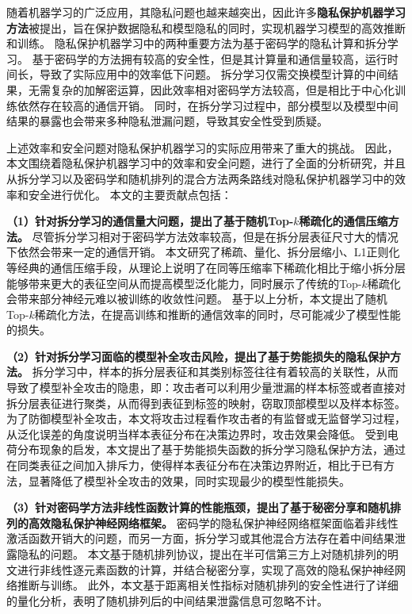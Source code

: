 \cleardoublepage
{}
随着机器学习的广泛应用，其隐私问题也越来越突出，因此许多\textbf{隐私保护机器学习方法}被提出，旨在保护数据隐私和模型隐私的同时，实现机器学习模型的高效推断和训练。
%
隐私保护机器学习中的两种重要方法为基于密码学的隐私计算和拆分学习。
基于密码学的方法拥有较高的安全性，但是其计算量和通信量较高，运行时间长，导致了实际应用中的效率低下问题。
拆分学习仅需交换模型计算的中间结果，无需复杂的加解密运算，因此效率相对密码学方法较高，但是相比于中心化训练依然存在较高的通信开销。
同时，在拆分学习过程中，部分模型以及模型中间结果的暴露也会带来多种隐私泄漏问题，导致其安全性受到质疑。
%

上述效率和安全问题对隐私保护机器学习的实际应用带来了重大的挑战。
%
因此，本文围绕着隐私保护机器学习中的效率和安全问题，进行了全面的分析研究，并且从拆分学习以及密码学和随机排列的混合方法两条路线对隐私保护机器学习中的效率和安全进行优化。
%
本文的主要贡献点包括：


\textbf{（1）针对拆分学习的通信量大问题，提出了基于随机Top-$k$稀疏化的通信压缩方法。}
尽管拆分学习相对于密码学方法效率较高，但是在拆分层表征尺寸大的情况下依然会带来一定的通信开销。
%
本文研究了稀疏、量化、拆分层缩小、L1正则化等经典的通信压缩手段，从理论上说明了在同等压缩率下稀疏化相比于缩小拆分层能够带来更大的表征空间从而提高模型泛化能力，同时展示了传统的Top-$k$稀疏化会带来部分神经元难以被训练的收敛性问题。
%
基于以上分析，本文提出了随机Top-$k$稀疏化方法，在提高训练和推断的通信效率的同时，尽可能减少了模型性能的损失。

\textbf{（2）针对拆分学习面临的模型补全攻击风险，提出了基于势能损失的隐私保护方法。}
拆分学习中，样本的拆分层表征和其类别标签往往有着较高的关联性，从而导致了模型补全攻击的隐患，即：攻击者可以利用少量泄漏的样本标签或者直接对拆分层表征进行聚类，从而得到表征到标签的映射，窃取顶部模型以及样本标签。
%
为了防御模型补全攻击，本文将攻击过程看作攻击者的有监督或无监督学习过程，从泛化误差的角度说明当样本表征分布在决策边界时，攻击效果会降低。
%
受到电荷分布现象的启发，本文提出了基于势能损失函数的拆分学习隐私保护方法，通过在同类表征之间加入排斥力，使得样本表征分布在决策边界附近，相比于已有方法，显著降低了模型补全攻击的效果，同时实现最少的模型性能损失。
%

\textbf{（3）针对密码学方法非线性函数计算的性能瓶颈，提出了基于秘密分享和随机排列的高效隐私保护神经网络框架。}
密码学的隐私保护神经网络框架面临着非线性激活函数开销大的问题，而另一方面，拆分学习或其他混合方法存在着中间结果泄露隐私的问题。
%
本文基于随机排列协议，提出在半可信第三方上对随机排列的明文进行非线性逐元素函数的计算，并结合秘密分享，实现了高效的隐私保护神经网络推断与训练。%
%
此外，本文基于距离相关性指标对随机排列的安全性进行了详细的量化分析，表明了随机排列后的中间结果泄露信息可忽略不计。


